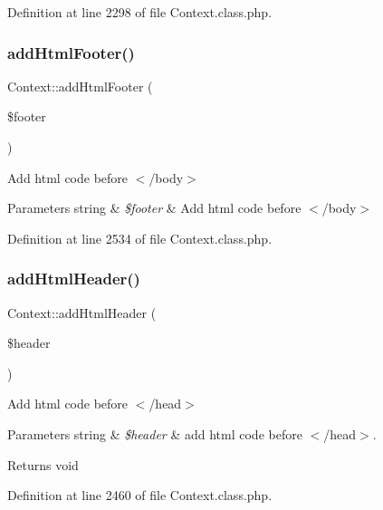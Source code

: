 Definition at line 2298 of file Context.\+class.\+php.

\hypertarget{classContext_aa81925b1cc7e991c1c798e739fe048a4}{}\label{classContext_aa81925b1cc7e991c1c798e739fe048a4} 
\subsubsection{\texorpdfstring{add\+Html\+Footer()}{addHtmlFooter()}}
{\footnotesize\ttfamily Context\+::add\+Html\+Footer (\begin{DoxyParamCaption}\item[{}]{\$footer }\end{DoxyParamCaption})}

Add html code before $<$/body$>$


\begin{DoxyParams}[1]{Parameters}
string & {\em \$footer} & Add html code before $<$/body$>$ \\
\hline
\end{DoxyParams}


Definition at line 2534 of file Context.\+class.\+php.

\hypertarget{classContext_a26a1aea944ae54bb826500f544a67950}{}\label{classContext_a26a1aea944ae54bb826500f544a67950} 
\subsubsection{\texorpdfstring{add\+Html\+Header()}{addHtmlHeader()}}
{\footnotesize\ttfamily Context\+::add\+Html\+Header (\begin{DoxyParamCaption}\item[{}]{\$header }\end{DoxyParamCaption})}

Add html code before $<$/head$>$


\begin{DoxyParams}[1]{Parameters}
string & {\em \$header} & add html code before $<$/head$>$. \\
\hline
\end{DoxyParams}
\begin{DoxyReturn}{Returns}
void 
\end{DoxyReturn}


Definition at line 2460 of file Context.\+class.\+php.

